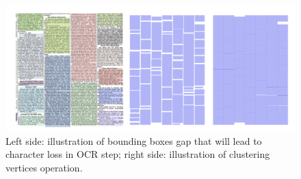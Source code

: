 \documentclass[letterpaper]{article} %
\begin{document}

 \begin{figure}[h]
   \centering
   \includegraphics[width=\linewidth]{LaTeX/Figures/clustering_v.png}
   \caption{Left side: illustration of bounding boxes gap that will lead to character loss in OCR step; right side: illustration of clustering vertices operation.}
   \label{fig:character_loss}
 \end{figure}
 


\end{document}

